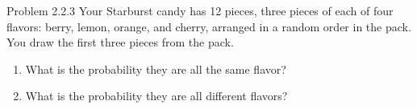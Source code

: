 \begin{problem}{Problem 2.2.3}
    Your Starburst candy has 12 pieces, three pieces of each of four flavors: berry, lemon, orange, and cherry, arranged in a random order in the pack. You draw the first three pieces from the pack.
    \begin{enumerate}
        \item What is the probability they are all the same flavor?
        \item What is the probability they are all different flavors?
    \end{enumerate}
\end{problem}